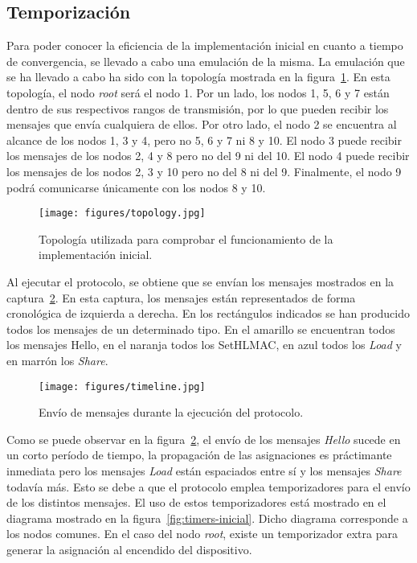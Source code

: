 \subsection{Temporización}\label{subsec:temporizadores}

Para poder conocer la eficiencia de la implementación inicial en cuanto a tiempo de convergencia, se  llevado a cabo una emulación de la misma.
La emulación que se ha llevado a cabo ha sido con la topología mostrada en la figura~\ref{fig:topology}.
En esta topología, el nodo \textit{root} será el nodo 1.
Por un lado, los nodos 1, 5, 6 y 7 están dentro de sus respectivos rangos de transmisión, por lo que pueden recibir los mensajes que envía cualquiera de ellos.
Por otro lado, el nodo 2 se encuentra al alcance de los nodos 1, 3 y 4, pero no 5, 6 y 7 ni 8 y 10.
El nodo 3 puede recibir los mensajes de los nodos 2, 4 y 8 pero no del 9 ni del 10.
El nodo 4 puede recibir los mensajes de los nodos 2, 3 y 10 pero no del 8 ni del 9.
Finalmente, el nodo 9 podrá comunicarse únicamente con los nodos 8 y 10.

\begin{figure}[h]
    \centering
    \texttt{[image: figures/topology.jpg]}
    \caption{Topología utilizada para comprobar el funcionamiento de la implementación inicial.}
    \label{fig:topology}
\end{figure}

Al ejecutar el protocolo, se obtiene que se envían los mensajes mostrados en la captura~\ref{fig:timeline}.
En esta captura, los mensajes están representados de forma cronológica de izquierda a derecha.
En los rectángulos indicados se han producido todos los mensajes de un determinado tipo.
En el amarillo se encuentran todos los mensajes Hello, en el naranja todos los SetHLMAC, en azul todos los \textit{Load} y en marrón los \textit{Share}.

\begin{figure}[h]
    \centering
    \texttt{[image: figures/timeline.jpg]}
    \caption{Envío de mensajes durante la ejecución del protocolo.}
    \label{fig:timeline}
\end{figure}

Como se puede observar en la figura~\ref{fig:timeline}, el envío de los mensajes \textit{Hello} sucede en un corto período de tiempo, la propagación de las asignaciones es práctimante inmediata pero los mensajes \textit{Load} están espaciados entre sí y los mensajes \textit{Share} todavía más.
Esto se debe a que el protocolo emplea temporizadores para el envío de los distintos mensajes.
El uso de estos temporizadores está mostrado en el diagrama mostrado en la figura~\ref{fig:timers-inicial}.
Dicho diagrama corresponde a los nodos comunes.
En el caso del nodo \textit{root}, existe un temporizador extra para generar la asignación al encendido del dispositivo.

